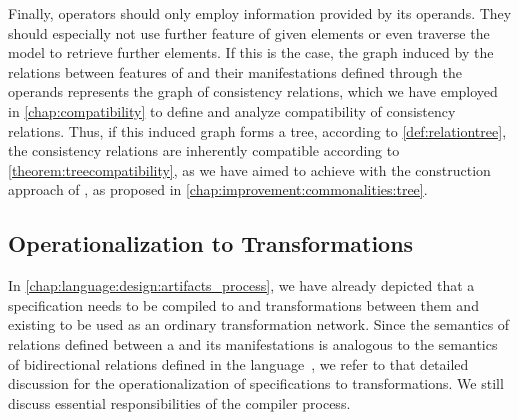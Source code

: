 Finally, operators should only employ information provided by its operands.
They should especially not use further feature of given elements or even traverse the model to retrieve further elements.
If this is the case, the graph induced by the relations between features of \commonalities and their manifestations defined through the operands represents the graph of consistency relations, which we have employed in \autoref{chap:compatibility} to define and analyze compatibility of consistency relations.
Thus, if this induced graph forms a tree, according to \autoref{def:relationtree}, the consistency relations are inherently compatible according to \autoref{theorem:treecompatibility}, as we have aimed to achieve with the construction approach of \commonalities, as proposed in \autoref{chap:improvement:commonalities:tree}.


\subsection{Operationalization to Transformations}
\label{chap:language:commonalities:operationalization}

In \autoref{chap:language:design:artifacts_process}, we have already depicted that a \commonalities specification needs to be compiled to \conceptmetamodels and transformations between them and existing \concretemetamodels to be used as an ordinary transformation network.
Since the semantics of relations defined between a \commonality and its manifestations is analogous to the semantics of bidirectional relations defined in the \mappings language~\cite[Chap. 7]{kramer2017a}, we refer to that detailed discussion for the operationalization of \commonalities specifications to transformations.
We still discuss essential responsibilities of the compiler process.

